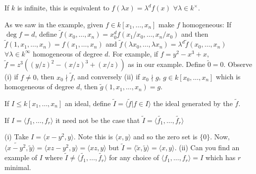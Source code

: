 \documentclass{article}
\begin{document}
If $k$ is infinite, this is equivalent to $f(\lambda x) = \lambda^df(x)$ $\forall \lambda \in k^\times$.

As we saw in the example, given $f \in k[x_1, \dotsc, x_n]$ make $f$ homogeneous:
If $\deg f = d$, define $\tilde{f}(x_0, \dotsc, x_n) = x_0^d f(x_1/x_0, \dotsc, x_n/x_0)$ and then $\tilde{f}(1, x_1, \dotsc, x_n) = f(x_1, \dotsc, x_n)$ and $\tilde{f}(\lambda x_0, \dotsc, \lambda x_n) = \lambda^d \tilde{f}(x_0, \dotsc, x_n)$ $\forall \lambda \in k^\infty$ homogeneous of degree $d$.
For example, if $f = y^2 - x^3 + x$, $\tilde{f} = z^3 ((y/z)^2 - (x/z)^3 + (x/z))$ as in our example.
Define $\tilde{0} = 0$.
Observe
(i) if $f \neq 0$, then $x_0 \nmid \tilde{f}$, and conversely
(ii) if $x_0 \nmid g$, $g \in k[x_0, \dotsc, x_n]$ which is homogeneous of degree $d$, then $\tilde{g}(1, x_1, \dotsc, x_n) = g$.
\begin{defi}
    If $I \leq k[x_1, \dotsc, x_n]$ an ideal, define $\tilde{I} = \langle \tilde{f} | f \in I \rangle$ the ideal generated by the $\tilde{f}$.
\end{defi}
\begin{warning}
    If $I = \langle f_1, \dotsc, f_r \rangle$ it need not be the case that $\tilde{I} = \langle \tilde{f_1}, \dotsc, \tilde{f_r}\rangle$
\end{warning}
\begin{eg}
    (i) Take $I = \langle x - y^2, y \rangle$. Note this is $\langle x, y \rangle$ and so the zero set is $\{0\}$. Now, $\langle \widetilde{x - y^2}, \tilde{y} \rangle = \langle xz - y^2, y \rangle = \langle xz, y\rangle$ but $\tilde{I} = \langle \tilde{x}, \tilde{y} \rangle = \langle x, y \rangle$.
    (ii)  Can you find an example of $I$ where $\tilde{I} \neq \langle \tilde{f_1}, \dotsc, \tilde{f_r} \rangle$ for any choice of $\langle f_1, \dotsc, f_r \rangle = I$ which has $r$ minimal.
\end{eg}
\end{document}
